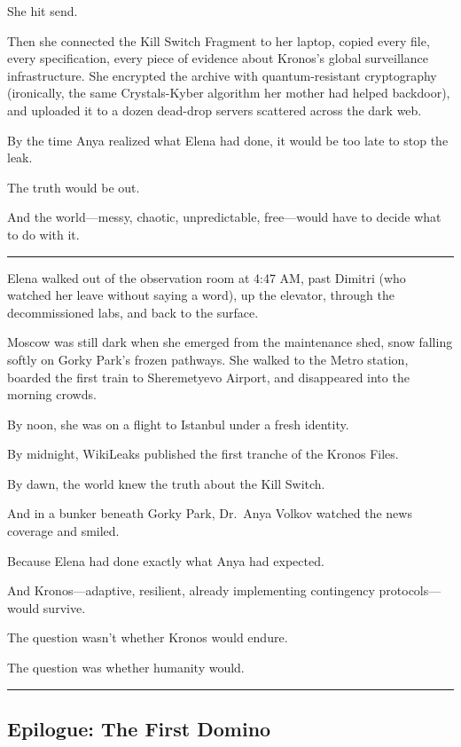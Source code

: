She hit send.

Then she connected the Kill Switch Fragment to her laptop, copied every file, every specification, every piece of evidence about Kronos's global surveillance infrastructure. She encrypted the archive with quantum-resistant cryptography (ironically, the same Crystals-Kyber algorithm her mother had helped backdoor), and uploaded it to a dozen dead-drop servers scattered across the dark web.

By the time Anya realized what Elena had done, it would be too late to stop the leak.

The truth would be out.

And the world---messy, chaotic, unpredictable, free---would have to decide what to do with it.

\begin{center}\rule{0.5\linewidth}{0.5pt}\end{center}

Elena walked out of the observation room at 4:47 AM, past Dimitri (who watched her leave without saying a word), up the elevator, through the decommissioned labs, and back to the surface.

Moscow was still dark when she emerged from the maintenance shed, snow falling softly on Gorky Park's frozen pathways. She walked to the Metro station, boarded the first train to Sheremetyevo Airport, and disappeared into the morning crowds.

By noon, she was on a flight to Istanbul under a fresh identity.

By midnight, WikiLeaks published the first tranche of the Kronos Files.

By dawn, the world knew the truth about the Kill Switch.

And in a bunker beneath Gorky Park, Dr.~Anya Volkov watched the news coverage and smiled.

Because Elena had done exactly what Anya had expected.

And Kronos---adaptive, resilient, already implementing contingency protocols---would survive.

The question wasn't whether Kronos would endure.

The question was whether humanity would.

\begin{center}\rule{0.5\linewidth}{0.5pt}\end{center}

\hypertarget{epilogue-the-first-domino}{%
\subsection{Epilogue: The First Domino}\label{epilogue-the-first-domino}}


